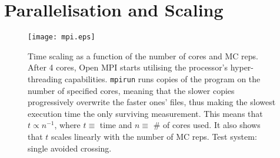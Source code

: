\section{Parallelisation and Scaling}
%
\begin{figure}[!htbp]
\centering
\texttt{[image: mpi.eps]}
\caption[Time scaling as a function of the number of cores and Monte-Carlo repetitions.]{Time scaling as a function of the number of cores and MC reps. After 4 cores, Open MPI starts utilising the processor's hyper-threading capabilities. \texttt{mpirun} runs copies of the program on the number of specified cores, meaning that the slower copies progressively overwrite the faster ones' files, thus making the slowest execution time the only surviving measurement. This means that $ t \propto n^{-1}$, where $ t \equiv $ time and $ n \equiv $ \# of cores used. It also shows that $ t $ scales linearly with the number of MC reps. Test system: single avoided crossing.}
\end{figure}